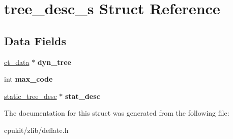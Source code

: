 \hypertarget{structtree__desc__s}{}\section{tree\+\_\+desc\+\_\+s Struct Reference}
\label{structtree__desc__s}
\subsection*{Data Fields}
\begin{DoxyCompactItemize}
\item 
\mbox{\label{structtree__desc__s_a5c79989c018b96c729e88e41f98a4920}} 
\mbox{\hyperlink{structct__data}{ct\+\_\+data}} $\ast$ {\bfseries dyn\+\_\+tree}
\item 
\mbox{\label{structtree__desc__s_a11f42f2c0464693def462dcfdd871002}} 
int {\bfseries max\+\_\+code}
\item 
\mbox{\label{structtree__desc__s_a7f237428776ee85058bb7f7f11900dd2}} 
\mbox{\hyperlink{structstatic__tree__desc__s}{static\+\_\+tree\+\_\+desc}} $\ast$ {\bfseries stat\+\_\+desc}
\end{DoxyCompactItemize}


The documentation for this struct was generated from the following file\+:\begin{DoxyCompactItemize}
\item 
cpukit/zlib/deflate.\+h\end{DoxyCompactItemize}
